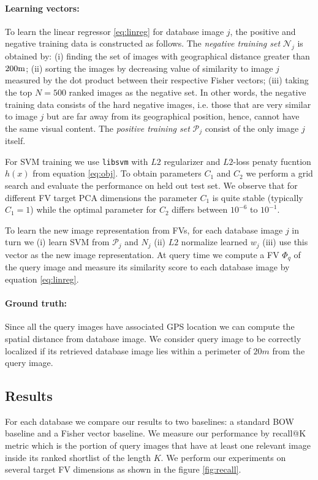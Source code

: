 \documentclass[table]{article} %
\begin{document}
	    \vspace{-4mm}
	    \paragraph{Learning vectors:}
			To learn the linear regressor \eqref{eq:linreg} for database image $j$, the positive and negative training data is constructed as follows. 
			The \emph{negative training set} $\mathcal N_j$ is obtained by: (i) finding the set of images with geographical distance greater than $200{\rm m}$; (ii)  sorting the images by decreasing value of similarity to image $j$ measured by the dot product between their respective Fisher vectors; (iii) taking the top $N=500$ ranked images as the negative set. 
			In other words, the negative training data consists of the hard negative images, i.e. those that are very similar to image $j$ but are far away from its geographical position, hence, cannot have the same visual content. The \emph{positive training set} $\mathcal P_j$ consist of the only image $j$ itself.

			For SVM training we use {\tt libsvm} \cite{libsvm} with $L2$ regularizer and $L2$-loss penaty fucntion $h(x)$ from equation \eqref{eq:obj}. To obtain parameters $C_1$ and $C_2$ we perform a grid search and evaluate the performance on held out test set. We observe that for different FV target PCA dimensions the parameter $C_1$ is quite stable (typically $C_1=1$) while the optimal parameter for $C_2$ differs between $10^{-6}$ to $10^{-1}$.

			To learn the new image representation from FVs, for each database image $j$ in turn we (i) learn SVM from $\mathcal P_j$ and $N_j$ (ii) $L2$ normalize learned $w_j$ (iii) use this vector as the new image representation. At query time we compute a FV $\Phi_q$ of the query image and measure its similarity score to each database image by equation \eqref{eq:linreg}.
		
		\vspace{-4mm}
		\paragraph{Ground truth:}
			Since all the query images have associated GPS location we can compute the spatial distance from database image. We consider query image to be correctly localized if its retrieved database image lies within a perimeter of $20m$ from the query image.


	\subsection{Results}
		For each database we compare our results to two baselines: a standard BOW baseline and a Fisher vector baseline. We measure our performance by recall@K metric which is the portion of query images that have at least one relevant image inside its ranked shortlist of the length $K$. We perform our experiments on several target FV dimensions as shown in the figure \ref{fig:recall}.
\end{document}
